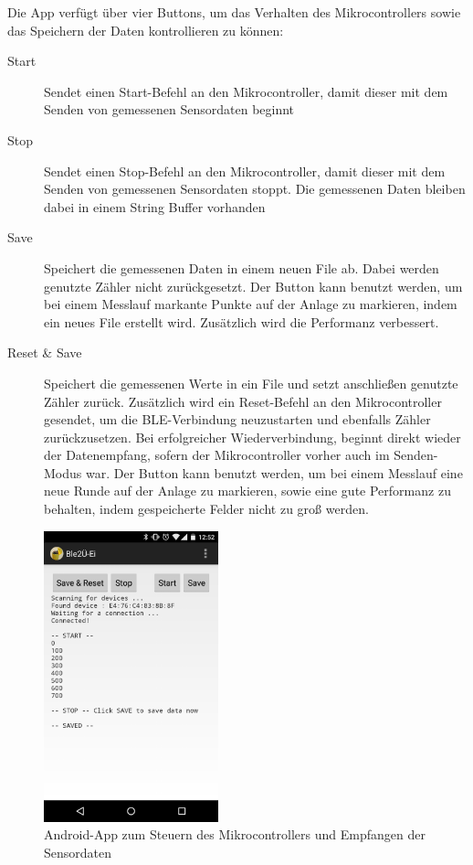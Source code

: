 Die App verfügt über vier Buttons, um das Verhalten des Mikrocontrollers sowie das Speichern der Daten kontrollieren zu können:
\begin{description}
	\item[Start] Sendet einen Start-Befehl an den Mikrocontroller, damit dieser mit dem Senden von gemessenen Sensordaten beginnt
	\item[Stop] Sendet einen Stop-Befehl an den Mikrocontroller, damit dieser mit dem Senden von gemessenen Sensordaten stoppt. Die gemessenen Daten bleiben dabei in einem String Buffer vorhanden
	\item[Save] Speichert die gemessenen Daten in einem neuen File ab. Dabei werden genutzte Zähler nicht zurückgesetzt. Der Button kann benutzt werden, um bei einem Messlauf markante Punkte auf der Anlage zu markieren, indem ein neues File erstellt wird. Zusätzlich wird die Performanz verbessert.
	\item[Reset \& Save] Speichert die gemessenen Werte in ein File und setzt anschließen genutzte Zähler zurück. Zusätzlich wird ein Reset-Befehl an den Mikrocontroller gesendet, um die BLE-Verbindung neuzustarten und ebenfalls Zähler zurückzusetzen. Bei erfolgreicher Wiederverbindung, beginnt direkt wieder der Datenempfang, sofern der Mikrocontroller vorher auch im Senden-Modus war. Der Button kann benutzt werden, um bei einem Messlauf eine neue Runde auf der Anlage zu markieren, sowie eine gute Performanz zu behalten, indem gespeicherte Felder nicht zu groß werden.
\end{description}

\begin{figure}[h]
	\centering
	\includegraphics[width=0.45\textwidth]{images/k3-androidapp.png}
	\caption {Android-App zum Steuern des Mikrocontrollers und Empfangen der Sensordaten}
	\label{fig:k3_androidapp}
\end{figure}

